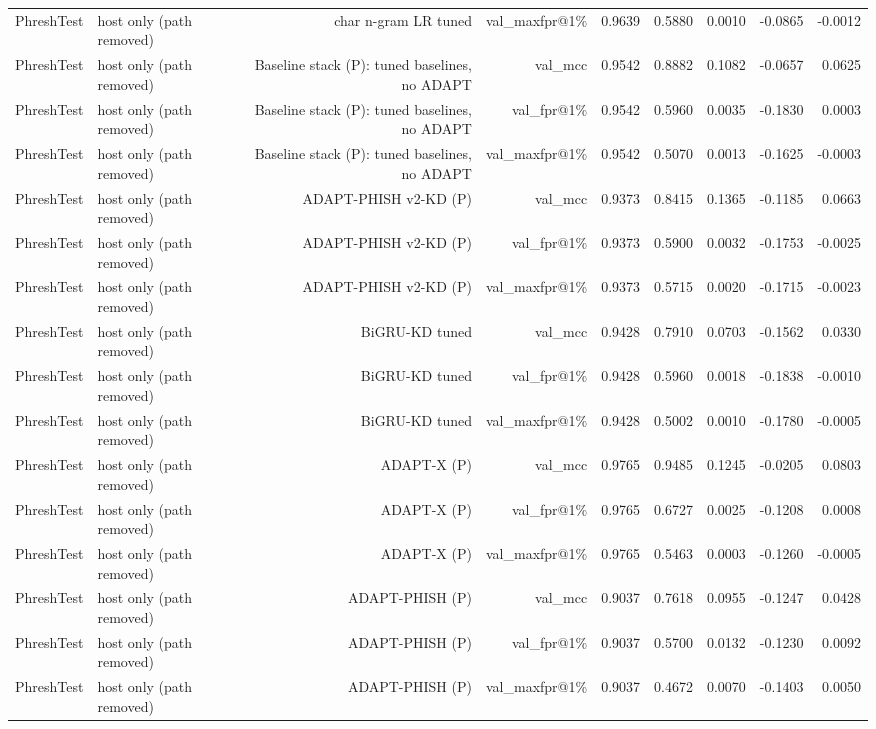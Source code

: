 \begin{table}[t]
\begin{tabular}{llrrrrrrr}
PhreshTest & host only (path removed) & char n-gram LR tuned & val\_maxfpr@1\% & 0.9639 & 0.5880 & 0.0010 & -0.0865 & -0.0012 \\
PhreshTest & host only (path removed) & Baseline stack (P): tuned baselines, no ADAPT & val\_mcc & 0.9542 & 0.8882 & 0.1082 & -0.0657 & 0.0625 \\
PhreshTest & host only (path removed) & Baseline stack (P): tuned baselines, no ADAPT & val\_fpr@1\% & 0.9542 & 0.5960 & 0.0035 & -0.1830 & 0.0003 \\
PhreshTest & host only (path removed) & Baseline stack (P): tuned baselines, no ADAPT & val\_maxfpr@1\% & 0.9542 & 0.5070 & 0.0013 & -0.1625 & -0.0003 \\
PhreshTest & host only (path removed) & ADAPT-PHISH v2-KD (P) & val\_mcc & 0.9373 & 0.8415 & 0.1365 & -0.1185 & 0.0663 \\
PhreshTest & host only (path removed) & ADAPT-PHISH v2-KD (P) & val\_fpr@1\% & 0.9373 & 0.5900 & 0.0032 & -0.1753 & -0.0025 \\
PhreshTest & host only (path removed) & ADAPT-PHISH v2-KD (P) & val\_maxfpr@1\% & 0.9373 & 0.5715 & 0.0020 & -0.1715 & -0.0023 \\
PhreshTest & host only (path removed) & BiGRU-KD tuned & val\_mcc & 0.9428 & 0.7910 & 0.0703 & -0.1562 & 0.0330 \\
PhreshTest & host only (path removed) & BiGRU-KD tuned & val\_fpr@1\% & 0.9428 & 0.5960 & 0.0018 & -0.1838 & -0.0010 \\
PhreshTest & host only (path removed) & BiGRU-KD tuned & val\_maxfpr@1\% & 0.9428 & 0.5002 & 0.0010 & -0.1780 & -0.0005 \\
PhreshTest & host only (path removed) & ADAPT-X (P) & val\_mcc & 0.9765 & 0.9485 & 0.1245 & -0.0205 & 0.0803 \\
PhreshTest & host only (path removed) & ADAPT-X (P) & val\_fpr@1\% & 0.9765 & 0.6727 & 0.0025 & -0.1208 & 0.0008 \\
PhreshTest & host only (path removed) & ADAPT-X (P) & val\_maxfpr@1\% & 0.9765 & 0.5463 & 0.0003 & -0.1260 & -0.0005 \\
PhreshTest & host only (path removed) & ADAPT-PHISH (P) & val\_mcc & 0.9037 & 0.7618 & 0.0955 & -0.1247 & 0.0428 \\
PhreshTest & host only (path removed) & ADAPT-PHISH (P) & val\_fpr@1\% & 0.9037 & 0.5700 & 0.0132 & -0.1230 & 0.0092 \\
PhreshTest & host only (path removed) & ADAPT-PHISH (P) & val\_maxfpr@1\% & 0.9037 & 0.4672 & 0.0070 & -0.1403 & 0.0050 \\

\end{tabular}
\end{table}
